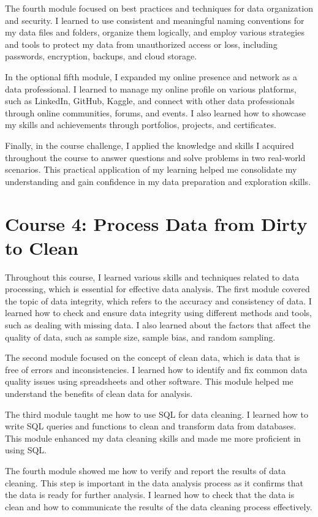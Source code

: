 \documentclass[]{article}
\begin{document}
The fourth module focused on best practices and techniques for data organization and security. I learned to use consistent and meaningful naming conventions for my data files and folders, organize them logically, and employ various strategies and tools to protect my data from unauthorized access or loss, including passwords, encryption, backups, and cloud storage.

In the optional fifth module, I expanded my online presence and network as a data professional. I learned to manage my online profile on various platforms, such as LinkedIn, GitHub, Kaggle, and connect with other data professionals through online communities, forums, and events. I also learned how to showcase my skills and achievements through portfolios, projects, and certificates.

Finally, in the course challenge, I applied the knowledge and skills I acquired throughout the course to answer questions and solve problems in two real-world scenarios. This practical application of my learning helped me consolidate my understanding and gain confidence in my data preparation and exploration skills.

\section{Course 4: Process Data from Dirty to Clean}
Throughout this course, I learned various skills and techniques related to data processing, which is essential for effective data analysis. The first module covered the topic of data integrity, which refers to the accuracy and consistency of data. I learned how to check and ensure data integrity using different methods and tools, such as dealing with missing data. I also learned about the factors that affect the quality of data, such as sample size, sample bias, and random sampling.

The second module focused on the concept of clean data, which is data that is free of errors and inconsistencies. I learned how to identify and fix common data quality issues using spreadsheets and other software. This module helped me understand the benefits of clean data for analysis.

The third module taught me how to use SQL for data cleaning. I learned how to write SQL queries and functions to clean and transform data from databases. This module enhanced my data cleaning skills and made me more proficient in using SQL.

The fourth module showed me how to verify and report the results of data cleaning. This step is important in the data analysis process as it confirms that the data is ready for further analysis. I learned how to check that the data is clean and how to communicate the results of the data cleaning process effectively.
\end{document}
